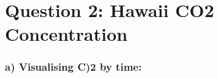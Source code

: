 \documentclass[11pt, a4paper]{article}
\begin{document}


\section*{Question 2: Hawaii CO2 Concentration}
\subsubsection*{a) Visualising C)2 by time:}
\end{document}
